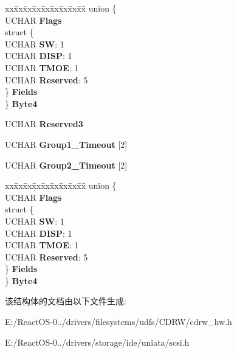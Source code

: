 \begin{DoxyCompactItemize}
\begin{tabbing}
xx\=xx\=xx\=xx\=xx\=xx\=xx\=xx\=xx\=\kill
union \{\\
\>UCHAR {\bfseries Flags}\\
\>struct \{\\
\>\>UCHAR {\bfseries SW}: 1\\
\>\>UCHAR {\bfseries DISP}: 1\\
\>\>UCHAR {\bfseries TMOE}: 1\\
\>\>UCHAR {\bfseries Reserved}: 5\\
\>\} {\bfseries Fields}\\
\} {\bfseries Byte4}\\

\end{tabbing}\item 
\mbox{\label{struct___m_o_d_e___t_i_m_e_o_u_t___a_n_d___p_r_o_t_e_c_t___p_a_g_e_afb22576163f31bac87583a02032d943d}} 
U\+C\+H\+AR {\bfseries Reserved3}
\item 
\mbox{\label{struct___m_o_d_e___t_i_m_e_o_u_t___a_n_d___p_r_o_t_e_c_t___p_a_g_e_a3d511f1b5667a45fade0e9ae3331cd2f}} 
U\+C\+H\+AR {\bfseries Group1\+\_\+\+Timeout} \mbox{[}2\mbox{]}
\item 
\mbox{\label{struct___m_o_d_e___t_i_m_e_o_u_t___a_n_d___p_r_o_t_e_c_t___p_a_g_e_aabd5d59dde2ffc01ec455351056cf43f}} 
U\+C\+H\+AR {\bfseries Group2\+\_\+\+Timeout} \mbox{[}2\mbox{]}
\item 
\mbox{\label{struct___m_o_d_e___t_i_m_e_o_u_t___a_n_d___p_r_o_t_e_c_t___p_a_g_e_a2f79d012f33c14dc64190309c5493c90}} 
\begin{tabbing}
xx\=xx\=xx\=xx\=xx\=xx\=xx\=xx\=xx\=\kill
union \{\\
\>UCHAR {\bfseries Flags}\\
\>struct \{\\
\>\>UCHAR {\bfseries SW}: 1\\
\>\>UCHAR {\bfseries DISP}: 1\\
\>\>UCHAR {\bfseries TMOE}: 1\\
\>\>UCHAR {\bfseries Reserved}: 5\\
\>\} {\bfseries Fields}\\
\} {\bfseries Byte4}\\

\end{tabbing}\end{DoxyCompactItemize}


该结构体的文档由以下文件生成\+:\begin{DoxyCompactItemize}
\item 
E\+:/\+React\+O\+S-\/0../drivers/filesystems/udfs/\+C\+D\+R\+W/cdrw\+\_\+hw.\+h\item 
E\+:/\+React\+O\+S-\/0../drivers/storage/ide/uniata/scsi.\+h\end{DoxyCompactItemize}
